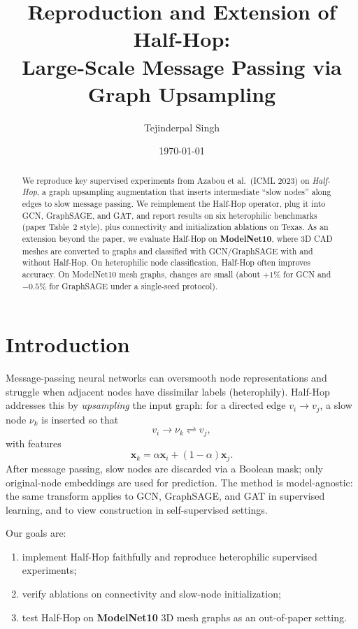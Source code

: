\documentclass[11pt,a4paper]{article}
\title{Reproduction and Extension of Half-Hop:\\
Large-Scale Message Passing via Graph Upsampling}
\author{Tejinderpal Singh}
\date{\today}
\begin{document}
\maketitle

\begin{abstract}
We reproduce key supervised experiments from Azabou et al.\ (ICML 2023) on
\textit{Half-Hop}, a graph upsampling augmentation that inserts intermediate
``slow nodes'' along edges to slow message passing.
We reimplement the Half-Hop operator, plug it into GCN, GraphSAGE, and GAT,
and report results on six heterophilic benchmarks (paper Table~2 style),
plus connectivity and initialization ablations on Texas.
As an extension beyond the paper, we evaluate Half-Hop on
\textbf{ModelNet10}, where 3D CAD meshes are converted to graphs and classified
with GCN/GraphSAGE with and without Half-Hop.
On heterophilic node classification, Half-Hop often improves accuracy.
On ModelNet10 mesh graphs, changes are small (about $+1\%$ for GCN and
$-0.5\%$ for GraphSAGE under a single-seed protocol).
\end{abstract}

\section{Introduction}
Message-passing neural networks can oversmooth node representations and
struggle when adjacent nodes have dissimilar labels (heterophily).
Half-Hop~\cite{azabou2023halfhop} addresses this by \emph{upsampling} the
input graph: for a directed edge $v_i \rightarrow v_j$, a slow node $\nu_k$
is inserted so that
\[
v_i \rightarrow \nu_k \rightleftharpoons v_j,
\]
with features
\[
\mathbf{x}_k = \alpha \mathbf{x}_i + (1-\alpha)\mathbf{x}_j.
\]
After message passing, slow nodes are discarded via a Boolean mask; only
original-node embeddings are used for prediction.
The method is model-agnostic: the same transform applies to GCN, GraphSAGE,
and GAT in supervised learning, and to view construction in self-supervised
settings.

Our goals are:
\begin{enumerate}
  \item implement Half-Hop faithfully and reproduce heterophilic supervised
        experiments;
  \item verify ablations on connectivity and slow-node initialization;
  \item test Half-Hop on \textbf{ModelNet10} 3D mesh graphs as an out-of-paper
        setting.
\end{enumerate}
\end{document}
